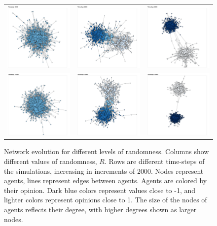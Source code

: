 \documentclass[11pt]{article}
\begin{document}
\begin{center}
\begin{figure}[H]
\begin{tabular}{ccc}
    \includegraphics[width=.15\linewidth]{../plots/networks/network_example_R0.1_8000.png} & \includegraphics[width=.15\linewidth]{../plots/networks/network_example_R0.3_8000.png} & \includegraphics[width=.15\linewidth]{../plots/networks/network_example_R0.5_8000.png}\\  
    \includegraphics[width=.15\linewidth]{../plots/networks/network_example_R0.1_10000.png} & \includegraphics[width=.15\linewidth]{../plots/networks/network_example_R0.3_10000.png} & \includegraphics[width=.15\linewidth]{../plots/networks/network_example_R0.5_10000.png}\\  
    \end{tabular} 
    \caption{Network evolution for different levels of randomness. Columns show different values of randomness, $R$. Rows are different time-steps of the simulations, increasing in increments of 2000. Nodes represent agents, lines represent edges between agents. Agents are colored by their opinion. Dark blue colors represent values close to -1, and lighter colors represent opinions close to 1. The size of the nodes of agents reflects their degree, with higher degrees shown as larger nodes.} 
    \label{fig:networks} 
    \end{figure} 
\end{center} 
\end{document}

